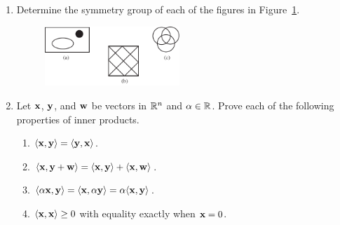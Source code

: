 {\begin{enumerate}
\begin{minipage}[t]{4.6in}
\begin{minipage}[t]{2.25in}
\begin{itemize}
 
 \item[{\bf (d)}]
 
 
\end{itemize}
\end{minipage}
\end{minipage}
 
\vspace{2pt}        %
 
 
 
\bf\item\rm %
Determine the symmetry group of each of the figures in
Figure~\ref{Determine}. 
\begin{figure}[htb]
\begin{center}
\centerline {
\includegraphics[width=2in]{SymmetryGrp}
}
\end{center}
\caption{}
\label{Determine}
\end{figure}
 
 
\bf\item\rm
Let ${\bold x}$, ${\bold y}$, and ${\bold w}$ be vectors in ${\Bbb
R}^n$ and $\alpha \in {\Bbb R}$.  Prove each of the following
properties of inner products.
\begin{enumerate}
 
 \bf\item\rm
$\langle {\bold x}, {\bold y} \rangle = \langle {\bold y}, {\bold x}
\rangle$. 
 
 \bf\item\rm
$\langle {\bold x}, {\bold y} + {\bold w} \rangle = \langle
{\bold x}, {\bold y} \rangle + \langle {\bold x}, {\bold w}
\rangle$.
 
 \bf\item\rm
$\langle \alpha {\bold x}, {\bold y} \rangle = \langle
{\bold x}, \alpha {\bold y} \rangle = \alpha \langle  {\bold
x}, {\bold y} \rangle$.
 
 \bf\item\rm
$\langle {\bold x}, {\bold x} \rangle \geq 0$ with equality exactly
when ${\bold x} = 0$. 
 

\end{enumerate}
\end{enumerate}}
